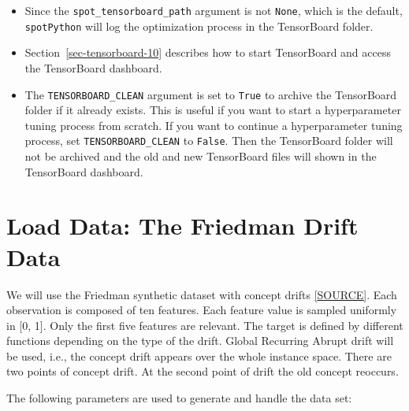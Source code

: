 \documentclass[
  letterpaper,
  DIV=11,
  numbers=noendperiod]{scrreprt}
\providecommand{\tightlist}{%
  \setlength{\itemsep}{0pt}\setlength{\parskip}{0pt}}\usepackage{longtable,booktabs,array}
\begin{document}
\begin{tcolorbox}[enhanced jigsaw, coltitle=black, bottomrule=.15mm, breakable, toprule=.15mm, colframe=quarto-callout-tip-color-frame, title=\textcolor{quarto-callout-tip-color}{\faLightbulb}\hspace{0.5em}{Tip: TensorBoard}, colbacktitle=quarto-callout-tip-color!10!white, opacityback=0, left=2mm, leftrule=.75mm, colback=white, rightrule=.15mm, bottomtitle=1mm, toptitle=1mm, titlerule=0mm, arc=.35mm, opacitybacktitle=0.6]

\begin{itemize}
\tightlist
\item
  Since the \texttt{spot\_tensorboard\_path} argument is not
  \texttt{None}, which is the default, \texttt{spotPython} will log the
  optimization process in the TensorBoard folder.
\item
  Section~\ref{sec-tensorboard-10} describes how to start TensorBoard
  and access the TensorBoard dashboard.
\item
  The \texttt{TENSORBOARD\_CLEAN} argument is set to \texttt{True} to
  archive the TensorBoard folder if it already exists. This is useful if
  you want to start a hyperparameter tuning process from scratch. If you
  want to continue a hyperparameter tuning process, set
  \texttt{TENSORBOARD\_CLEAN} to \texttt{False}. Then the TensorBoard
  folder will not be archived and the old and new TensorBoard files will
  shown in the TensorBoard dashboard.
\end{itemize}

\end{tcolorbox}

\section{Load Data: The Friedman Drift
Data}\label{load-data-the-friedman-drift-data-1}

We will use the Friedman synthetic dataset with concept drifts
\href{https://riverml.xyz/0.18.0/api/datasets/synth/FriedmanDrift/}{{[}SOURCE{]}}.
Each observation is composed of ten features. Each feature value is
sampled uniformly in {[}0, 1{]}. Only the first five features are
relevant. The target is defined by different functions depending on the
type of the drift. Global Recurring Abrupt drift will be used, i.e., the
concept drift appears over the whole instance space. There are two
points of concept drift. At the second point of drift the old concept
reoccurs.

The following parameters are used to generate and handle the data set:
\end{document}
